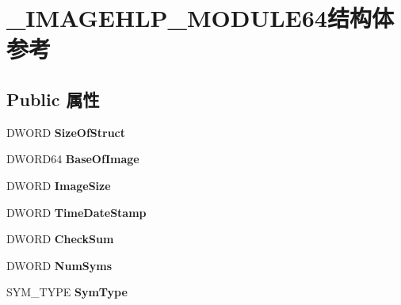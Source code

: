 \hypertarget{struct___i_m_a_g_e_h_l_p___m_o_d_u_l_e64}{}\section{\+\_\+\+I\+M\+A\+G\+E\+H\+L\+P\+\_\+\+M\+O\+D\+U\+L\+E64结构体 参考}
\label{struct___i_m_a_g_e_h_l_p___m_o_d_u_l_e64}
\subsection*{Public 属性}
\begin{DoxyCompactItemize}
\item 
\mbox{\label{struct___i_m_a_g_e_h_l_p___m_o_d_u_l_e64_a4a2ce54731d9419530a0a0259fb2247c}} 
D\+W\+O\+RD {\bfseries Size\+Of\+Struct}
\item 
\mbox{\label{struct___i_m_a_g_e_h_l_p___m_o_d_u_l_e64_a8939132963344f64d22dd5d909ae1c09}} 
D\+W\+O\+R\+D64 {\bfseries Base\+Of\+Image}
\item 
\mbox{\label{struct___i_m_a_g_e_h_l_p___m_o_d_u_l_e64_a4dbf87d9da85b62bc0c404f9ce16e2d5}} 
D\+W\+O\+RD {\bfseries Image\+Size}
\item 
\mbox{\label{struct___i_m_a_g_e_h_l_p___m_o_d_u_l_e64_a280ae94e389b6070e0e9a0b0d9b51012}} 
D\+W\+O\+RD {\bfseries Time\+Date\+Stamp}
\item 
\mbox{\label{struct___i_m_a_g_e_h_l_p___m_o_d_u_l_e64_aa7d1e2fc9139ef2a811c0f29a7c3264e}} 
D\+W\+O\+RD {\bfseries Check\+Sum}
\item 
\mbox{\label{struct___i_m_a_g_e_h_l_p___m_o_d_u_l_e64_a7ebda45966492626167b9e35ec4e6e59}} 
D\+W\+O\+RD {\bfseries Num\+Syms}
\item 
\mbox{\label{struct___i_m_a_g_e_h_l_p___m_o_d_u_l_e64_a18640a2da772eca54c9cce12fe881217}} 
S\+Y\+M\+\_\+\+T\+Y\+PE {\bfseries Sym\+Type}
\item 

\end{DoxyCompactItemize}
